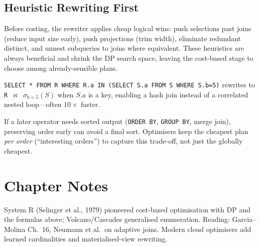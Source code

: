 \subsection{Heuristic Rewriting First}

Before costing, the rewriter applies cheap logical wins: push selections past joins (reduce input size early), push projections (trim width), eliminate redundant distinct, and unnest subqueries to joins where equivalent. These heuristics are always beneficial and shrink the DP search space, leaving the cost-based stage to choose among already-sensible plans.

\begin{example}[Unnesting]
\texttt{SELECT * FROM R WHERE R.a IN (SELECT S.a FROM S WHERE S.b=5)} rewrites to \texttt{R $\bowtie$ $\sigma_{b=5}(S)$} when $S.a$ is a key, enabling a hash join instead of a correlated nested loop---often $10\times$ faster.
\end{example}

\begin{remark}
If a later operator needs sorted output (\texttt{ORDER BY}, \texttt{GROUP BY}, merge join), preserving order early can avoid a final sort. Optimisers keep the cheapest plan \emph{per order} (``interesting orders'') to capture this trade-off, not just the globally cheapest.
\end{remark}

\section{Chapter Notes}

System R (Selinger et al., 1979) pioneered cost-based optimisation with DP and the formulas above; Volcano/Cascades generalised enumeration. Reading: Garcia--Molina Ch.~16, Neumann et al.\ on adaptive joins. Modern cloud optimisers add learned cardinalities and materialised-view rewriting.

